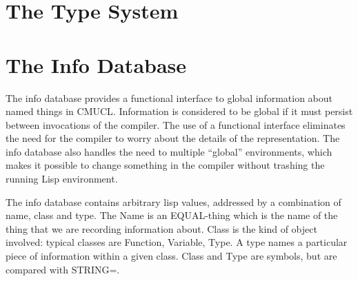 \chapter{The Type System}



\chapter{The Info Database}

The info database provides a functional interface to global
information about named things in CMUCL. Information is considered to
be global if it must persist between invocations of the compiler. The
use of a functional interface eliminates the need for the compiler to
worry about the details of the representation. The info database also
handles the need to multiple ``global'' environments, which makes it
possible to change something in the compiler without trashing the
running Lisp environment.

The info database contains arbitrary lisp values, addressed by a
combination of name, class and type. The Name is an EQUAL-thing which
is the name of the thing that we are recording information about.
Class is the kind of object involved: typical classes are Function,
Variable, Type. A type names a particular piece of information within
a given class. Class and Type are symbols, but are compared with
STRING=.

